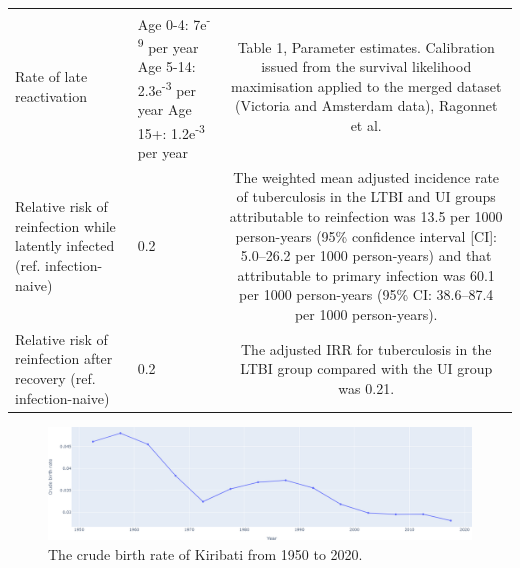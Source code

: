 \documentclass{article}
\begin{document}
\begin{table}[!htp]
\begin{tabularx}{\textwidth}{ X  X  c }
        Rate of late reactivation & 
        \begin{minipage}[t]{0.3\textwidth}
            Age 0-4: 7e\textsuperscript{-9} per year \newline
            Age 5-14: 2.3e\textsuperscript{-3} per year  \newline
            Age 15+: 1.2e\textsuperscript{-3} per year \newline
        \end{minipage}
        &
        \begin{minipage}[t]{0.4\textwidth}
        Table 1, Parameter estimates. Calibration issued from the survival likelihood maximisation applied 
        to the merged dataset (Victoria and Amsterdam data), Ragonnet et al.\cite{ragonnet-2017}
        \end{minipage} \\
        Relative risk of reinfection while latently infected (ref. infection-naive) & 0.2 &
        \begin{minipage}[t]{0.4\textwidth}
        The weighted mean adjusted incidence rate of tuberculosis in the LTBI and UI 
        groups attributable to reinfection was 13.5 per 1000 person-years
        (95\% confidence interval [CI]: 5.0–26.2 per 1000 person-years) and that 
        attributable to primary infection was 60.1 per 1000 person-years 
        (95\% CI: 38.6–87.4 per 1000 person-years). \cite{andrews-2012}
        \end{minipage} \\
        Relative risk of reinfection after recovery (ref. infection-naive) & 0.2 & \begin{minipage}[t]{0.4\textwidth}
        The adjusted IRR for tuberculosis in the LTBI group compared with the UI group was 0.21. \cite{andrews-2012} 
        \end{minipage} \\
        \hline
	\end{tabularx}
\end{table}

\begin{figure}[!htp]
   \includegraphics[width=\textwidth,keepaspectratio]{images/cbr.png}
    \caption{The crude birth rate of Kiribati from 1950 to 2020.}
    \label{fig:cbr}
\end{figure}
\end{document}
